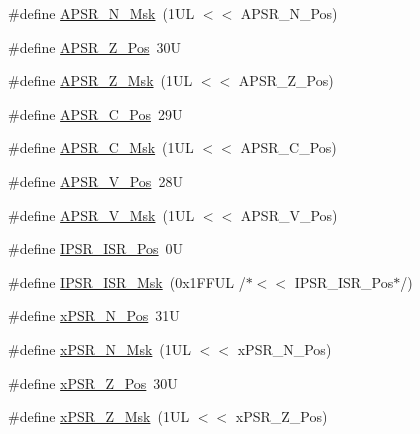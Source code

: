 \begin{DoxyCompactItemize}
\item 
\#define \mbox{\hyperlink{group___c_m_s_i_s___c_o_r_e_gadbc2cf55a026f661b53fadfcf822cef1}{A\+P\+S\+R\+\_\+\+N\+\_\+\+Msk}}~(1\+U\+L $<$$<$ A\+P\+S\+R\+\_\+\+N\+\_\+\+Pos)
\item 
\#define \mbox{\hyperlink{group___c_m_s_i_s___c_o_r_e_ga3661286d108b1aca308d7445685eae3a}{A\+P\+S\+R\+\_\+\+Z\+\_\+\+Pos}}~30U
\item 
\#define \mbox{\hyperlink{group___c_m_s_i_s___c_o_r_e_ga1deb4d1aa72bb83d1f79329406f15711}{A\+P\+S\+R\+\_\+\+Z\+\_\+\+Msk}}~(1\+U\+L $<$$<$ A\+P\+S\+R\+\_\+\+Z\+\_\+\+Pos)
\item 
\#define \mbox{\hyperlink{group___c_m_s_i_s___c_o_r_e_ga6cf72aa6f09a168f9e5beda1a4a887b9}{A\+P\+S\+R\+\_\+\+C\+\_\+\+Pos}}~29U
\item 
\#define \mbox{\hyperlink{group___c_m_s_i_s___c_o_r_e_ga6d47803fbad455bc10bd1ce59f2f335d}{A\+P\+S\+R\+\_\+\+C\+\_\+\+Msk}}~(1\+U\+L $<$$<$ A\+P\+S\+R\+\_\+\+C\+\_\+\+Pos)
\item 
\#define \mbox{\hyperlink{group___c_m_s_i_s___c_o_r_e_gac62830f67679ccd11658c4172c3e6ea7}{A\+P\+S\+R\+\_\+\+V\+\_\+\+Pos}}~28U
\item 
\#define \mbox{\hyperlink{group___c_m_s_i_s___c_o_r_e_ga33305d6701356bff6890b315fe8b5489}{A\+P\+S\+R\+\_\+\+V\+\_\+\+Msk}}~(1\+U\+L $<$$<$ A\+P\+S\+R\+\_\+\+V\+\_\+\+Pos)
\item 
\#define \mbox{\hyperlink{group___c_m_s_i_s___c_o_r_e_ga0e34027584d02c43811ae908a5ca9adf}{I\+P\+S\+R\+\_\+\+I\+S\+R\+\_\+\+Pos}}~0U
\item 
\#define \mbox{\hyperlink{group___c_m_s_i_s___c_o_r_e_gaf013a4579a64d1f21f56ea9f1b33ab56}{I\+P\+S\+R\+\_\+\+I\+S\+R\+\_\+\+Msk}}~(0x1\+F\+F\+U\+L /$\ast$$<$$<$ I\+P\+S\+R\+\_\+\+I\+S\+R\+\_\+\+Pos$\ast$/)
\item 
\#define \mbox{\hyperlink{group___c_m_s_i_s___c_o_r_e_ga031eb1b8ebcdb3d602d0b9f2ec82a7ae}{x\+P\+S\+R\+\_\+\+N\+\_\+\+Pos}}~31U
\item 
\#define \mbox{\hyperlink{group___c_m_s_i_s___c_o_r_e_gaf600f4ff41b62cf2f3b0a59b6d2e93d6}{x\+P\+S\+R\+\_\+\+N\+\_\+\+Msk}}~(1\+U\+L $<$$<$ x\+P\+S\+R\+\_\+\+N\+\_\+\+Pos)
\item 
\#define \mbox{\hyperlink{group___c_m_s_i_s___c_o_r_e_ga5869dd608eea73c80f0567d781d2230b}{x\+P\+S\+R\+\_\+\+Z\+\_\+\+Pos}}~30U
\item 
\#define \mbox{\hyperlink{group___c_m_s_i_s___c_o_r_e_ga907599209fba99f579778e662021c4f2}{x\+P\+S\+R\+\_\+\+Z\+\_\+\+Msk}}~(1\+U\+L $<$$<$ x\+P\+S\+R\+\_\+\+Z\+\_\+\+Pos)

\end{DoxyCompactItemize}
